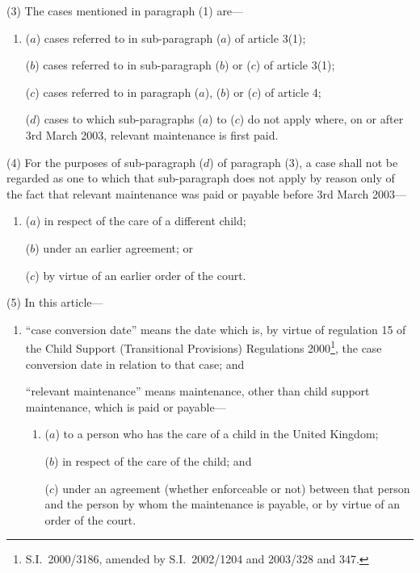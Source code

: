 \documentclass[12pt,a4paper]{article}
\begin{document}
(3) The cases mentioned in paragraph (1) are—
\begin{enumerate}\item[]
($a$) cases referred to in sub-paragraph ($a$)  of article 3(1);

($b$) cases referred to in sub-paragraph ($b$)  or ($c$)  of article 3(1);

($c$) cases referred to in paragraph ($a$), ($b$)  or ($c$)  of article 4;

($d$) cases to which sub-paragraphs ($a$)  to ($c$)  do not apply where, on or after 3rd March 2003, relevant maintenance is first paid.
\end{enumerate}

(4) For the purposes of sub-paragraph ($d$)  of paragraph (3), a case shall not be regarded as one to which that sub-paragraph does not apply by reason only of the fact that relevant maintenance was paid or payable before 3rd March 2003—
\begin{enumerate}\item[]
($a$) in respect of the care of a different child;

($b$) under an earlier agreement; or

($c$) by virtue of an earlier order of the court.
\end{enumerate}

(5) In this article—
\begin{enumerate}\item[]
“case conversion date” means the date which is, by virtue of regulation 15 of the Child Support (Transitional Provisions) Regulations 2000\footnote{S.I.\ 2000/3186, amended by S.I.\ 2002/1204 and 2003/328 and 347.}, the case conversion date in relation to that case; and

“relevant maintenance” means maintenance, other than child support maintenance, which is paid or payable—
\begin{enumerate}\item[]
($a$) 
to a person who has the care of a child in the United Kingdom;

($b$) 
in respect of the care of the child; and

($c$) 
under an agreement (whether enforceable or not) between that person and the person by whom the maintenance is payable, or by virtue of an order of the court.
\end{enumerate}
\end{enumerate}

\end{document}
